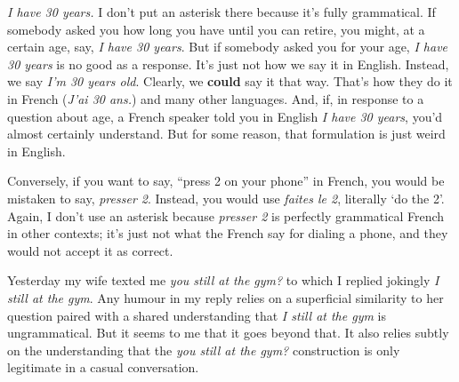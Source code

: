 \textit{I have 30 years.} I don't put an asterisk there because it's fully grammatical. If somebody asked you how long you have until you can retire, you might, at a certain age, say, \textit{I have 30 years}. But if somebody asked you for your age, \textit{I have 30 years} is no good as a response. It's just not how we say it in English. Instead, we say \textit{I'm 30 years old}. Clearly, we \textbf{could} say it that way. That's how they do it in French (\textit{J'ai 30 ans.}) and many other languages. And, if, in response to a question about age, a French speaker told you in English \textit{I have 30 years}, you'd almost certainly understand. But for some reason, that formulation is just weird in English.

Conversely, if you want to say, \enquote{press 2 on your phone} in French, you would be mistaken to say, \textit{presser 2}. Instead, you would use \textit{faites le 2}, literally `do the 2'. Again, I don't use an asterisk because \textit{presser 2} is perfectly grammatical French in other contexts; it's just not what the French say for dialing a phone, and they would not accept it as correct.

\bigskip

Yesterday my wife texted me \textit{you still at the gym?} to which I replied jokingly \textit{I still at the gym}. Any humour in my reply relies on a superficial similarity to her question paired with a shared understanding that \textit{I still at the gym} is ungrammatical. But it seems to me that it goes beyond that. It also relies subtly on the understanding that the \textit{you still at the gym?} construction is only legitimate in a casual conversation.

\ea
    \z
\z
\ea
    \z
\z
\ea
    \z
\z
\ea
    \z
\z
\ea
    \z
\z
\ea
    \z
\z
\ea
    \z
\z


